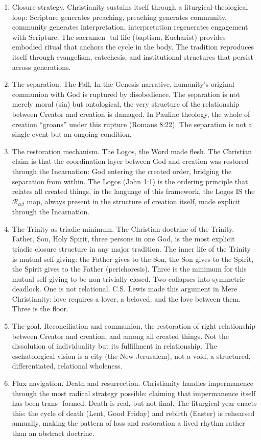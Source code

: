 \documentclass[
]{article}
\providecommand{\tightlist}{%
  \setlength{\itemsep}{0pt}\setlength{\parskip}{0pt}}
\begin{document}
\begin{enumerate}
\def\labelenumi{\arabic{enumi}.}
\setcounter{enumi}{22}
\tightlist
\item
  Closure strategy. Christianity sustains itself through a
  liturgical-theological loop: Scripture generates preaching, preaching
  generates community, community generates interpretation,
  interpretation regenerates engagement with Scripture. The sacramen-
  tal life (baptism, Eucharist) provides embodied ritual that anchors
  the cycle in the body. The tradition reproduces itself through
  evangelism, catechesis, and institutional structures that persist
  across generations.
\item
  The separation. The Fall. In the Genesis narrative, humanity's
  original communion with God is ruptured by disobedience. The
  separation is not merely moral (sin) but ontological, the very
  structure of the relationship between Creator and creation is damaged.
  In Pauline theology, the whole of creation ``groans'' under this
  rupture (Romans 8:22). The separation is not a single event but an
  ongoing condition.
\item
  The restoration mechanism. The Logos, the Word made flesh. The
  Christian claim is that the coordination layer between God and
  creation was restored through the Incarnation: God entering the
  created order, bridging the separation from within. The Logos (John
  1:1) is the ordering principle that relates all created things, in the
  language of this framework, the Logos IS the
  \(\mathcal{R}_{\alpha\beta}\) map, always present in the structure of
  creation itself, made explicit through the Incarnation.
\item
  The Trinity as triadic minimum. The Christian doctrine of the Trinity.
  Father, Son, Holy Spirit, three persons in one God, is the most
  explicit triadic closure structure in any major tradition. The inner
  life of the Trinity is mutual self-giving: the Father gives to the
  Son, the Son gives to the Spirit, the Spirit gives to the Father
  (perichoresis). Three is the minimum for this mutual self-giving to be
  non-trivially closed. Two collapses into symmetric deadlock. One is
  not relational. C.S. Lewis made this argument in Mere Christianity:
  love requires a lover, a beloved, and the love between them. Three is
  the floor.
\item
  The goal. Reconciliation and communion, the restoration of right
  relationship between Creator and creation, and among all created
  things. Not the dissolution of individuality but its fulfillment in
  relationship. The eschatological vision is a city (the New Jerusalem),
  not a void, a structured, differentiated, relational wholeness.
\item
  Flux navigation. Death and resurrection. Christianity handles
  impermanence through the most radical strategy possible: claiming that
  impermanence itself has been trans- formed. Death is real, but not
  final. The liturgical year enacts this: the cycle of death (Lent, Good
  Friday) and rebirth (Easter) is rehearsed annually, making the pattern
  of loss and restoration a lived rhythm rather than an abstract
  doctrine.
\end{enumerate}
\end{document}
